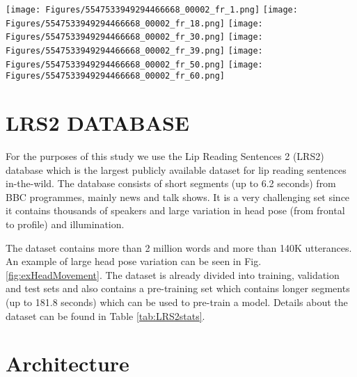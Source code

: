 \documentclass{article}
\begin{document}
\begin{figure*}[htp]

\centering
\texttt{[image: Figures/5547533949294466668\_00002\_fr\_1.png]}\hfill
\texttt{[image: Figures/5547533949294466668\_00002\_fr\_18.png]}\hfill
\texttt{[image: Figures/5547533949294466668\_00002\_fr\_30.png]}\hfill
\texttt{[image: Figures/5547533949294466668\_00002\_fr\_39.png]}\hfill
\texttt{[image: Figures/5547533949294466668\_00002\_fr\_50.png]}\hfill
\texttt{[image: Figures/5547533949294466668\_00002\_fr\_60.png]}
\caption{Example of significant head pose variation from the LRS2 dataset.}
\label{fig:exHeadMovement}

\end{figure*}


















\section{LRS2 DATABASE}
\label{sec:LRS2}

For the purposes of this study we use the Lip Reading Sentences 2 (LRS2) database \cite{Chung17cvpr,Chung17bmvc} which is the largest publicly available dataset for lip reading sentences in-the-wild. The database consists of short segments (up to 6.2 seconds) from BBC programmes, mainly news and talk shows. It is a very challenging set since it contains thousands of speakers and large variation in head pose (from frontal to profile) and illumination. 

The dataset contains more than 2 million words and more than 140K utterances. An example of large head pose variation can be seen in Fig. \ref{fig:exHeadMovement}. The dataset is already divided into training, validation and test sets and also contains a pre-training set which contains longer segments (up to 181.8 seconds) which can be used to pre-train a model. Details about the dataset can be found in Table \ref{tab:LRS2stats}.




\section{Architecture}
\end{document}
